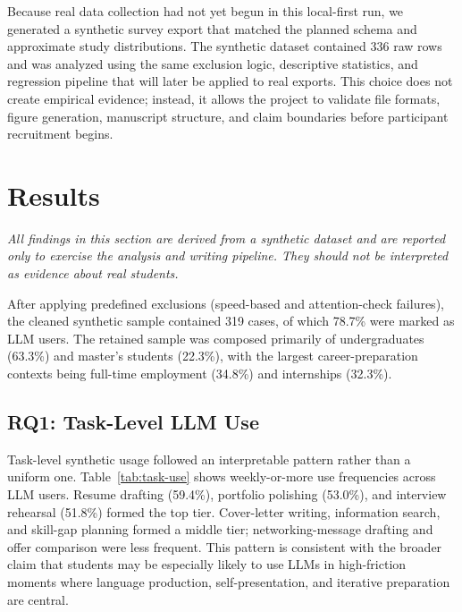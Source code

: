 \documentclass[sigconf,review,anonymous]{acmart}
\begin{document}
Because real data collection had not yet begun in this local-first run, we generated a synthetic survey export that matched the planned schema and approximate study distributions. The synthetic dataset contained 336 raw rows and was analyzed using the same exclusion logic, descriptive statistics, and regression pipeline that will later be applied to real exports. This choice does not create empirical evidence; instead, it allows the project to validate file formats, figure generation, manuscript structure, and claim boundaries before participant recruitment begins.

\section{Results}
\label{sec:results}

\emph{All findings in this section are derived from a synthetic dataset and are reported only to exercise the analysis and writing pipeline. They should not be interpreted as evidence about real students.}

After applying predefined exclusions (speed-based and attention-check failures), the cleaned synthetic sample contained 319 cases, of which 78.7\% were marked as LLM users. The retained sample was composed primarily of undergraduates (63.3\%) and master's students (22.3\%), with the largest career-preparation contexts being full-time employment (34.8\%) and internships (32.3\%).

\subsection{RQ1: Task-Level LLM Use}

Task-level synthetic usage followed an interpretable pattern rather than a uniform one. Table~\ref{tab:task-use} shows weekly-or-more use frequencies across LLM users. Resume drafting (59.4\%), portfolio polishing (53.0\%), and interview rehearsal (51.8\%) formed the top tier. Cover-letter writing, information search, and skill-gap planning formed a middle tier; networking-message drafting and offer comparison were less frequent. This pattern is consistent with the broader claim that students may be especially likely to use LLMs in high-friction moments where language production, self-presentation, and iterative preparation are central.
\end{document}
